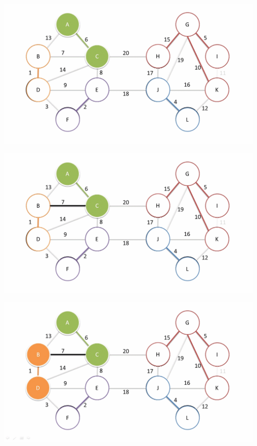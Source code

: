 \documentclass[
	11pt, %
]{beamer}
\begin{document}
\begin{frame}
    \includegraphics[width = 1\textwidth]{baruvka-example/frame_21_delay-1s.png}
\end{frame}
\begin{frame}
    \includegraphics[width = 1\textwidth]{baruvka-example/frame_22_delay-1s.png}
\end{frame}
\begin{frame}
    \includegraphics[width = 1\textwidth]{baruvka-example/frame_23_delay-1s.png}
\end{frame}
\end{document}
